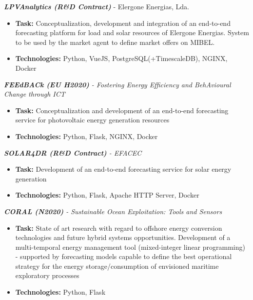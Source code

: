\documentclass{mycv}
\begin{document}
\begin{myitemize}
\newpage
	\vspace{0.30cm}	
	\item \textit{\textbf{LPVAnalytics (R\&D Contract)}} - Elergone Energias, Lda.
	\begin{itemize}
		\item \textbf{Task:} Conceptualization, development and integration of an end-to-end forecasting platform for load and solar resources of Elergone Energias. System to be used by the market agent to define market offers on MIBEL.
		\item \textbf{Technologies:} Python, VueJS, PostgreSQL(+TimescaleDB), NGINX, Docker
	\end{itemize}

	\vspace{0.30cm}	
	\item \textit{\textbf{FEEdBACk (EU H2020)} - Fostering Energy Efficiency and BehAvioural Change through ICT}
	\begin{itemize}
		\item \textbf{Task:} Conceptualization and development of an end-to-end forecasting service for photovoltaic energy generation resources
		\item \textbf{Technologies:} Python, Flask, NGINX, Docker
	\end{itemize}
	
	\vspace{0.30cm}	
	\item \textit{\textbf{SOLAR4DR (R\&D Contract)} - EFACEC}
	\begin{itemize}
		\item \textbf{Task:} Development of an end-to-end forecasting service for solar energy generation
		\item \textbf{Technologies:} Python, Flask, Apache HTTP Server, Docker
	\end{itemize}
		
	\vspace{0.30cm}	
	\item \textit{\textbf{CORAL (N2020)} - Sustainable Ocean Exploitation: Tools and Sensors}
	\begin{itemize}
		\item \textbf{Task:} State of art research with regard to offshore energy conversion technologies and future hybrid systems opportunities. Development of a multi-temporal energy management tool (mixed-integer linear programming) - supported by forecasting models capable to define the best operational strategy for the energy storage/consumption of envisioned maritime exploratory processes
		\item \textbf{Technologies:} Python, Flask
	\end{itemize}

		
\end{myitemize}
\end{document}
